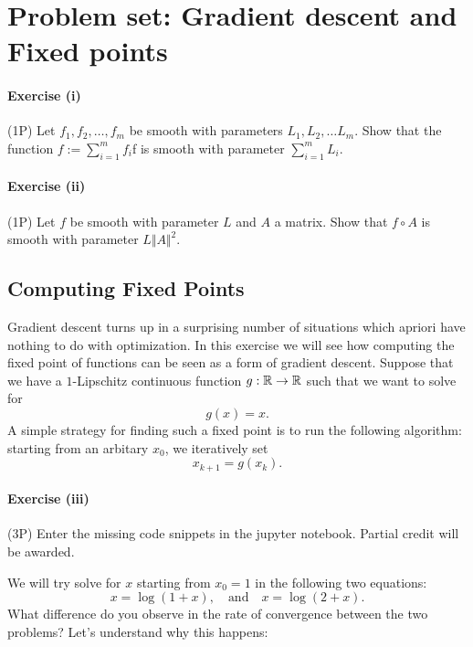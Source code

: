 \documentclass{scrartcl}
\theoremstyle{definition}
\begin{document}
\section*{Problem set: Gradient descent and Fixed points}%



\paragraph{Exercise (i)} (1P)  Let $f_1, f_2, \dots, f_m$ be smooth with parameters $L_1, L_2, \dots L_m$. Show that the function $f:= \sum_{i=1}^{m}f_i$f is smooth with parameter $\sum_{i=1}^{m}L_i$.

\paragraph{Exercise (ii)} (1P)  Let $f$ be smooth with parameter $L$ and $A$ a matrix. Show that $f\circ A$ is smooth with parameter $L \Vert A \Vert^2$.




\subsection*{Computing Fixed Points}%

Gradient descent turns up in a surprising number of situations which apriori have nothing to do with optimization.
In this exercise we will see how computing the fixed point of functions can be seen as a form of gradient descent.
Suppose that we have a $1$-Lipschitz continuous function $g : \mathbb{R} \to \mathbb{R}$ such that we want to solve for
\begin{equation}
  g(x) = x .
\end{equation}
A simple strategy for finding such a fixed point is to run the following algorithm: starting from an arbitary $x_0$,
we iteratively set
\begin{equation}
  \label{fpi}
  x_{k+1} = g(x_k) .
\end{equation}

\paragraph{Exercise (iii)} (3P) Enter the missing code snippets in the jupyter notebook. Partial credit will be awarded.

We will try solve for $x$ starting from $x_0 = 1$ in the following two equations:
\begin{equation}
  \label{log}
  x = \log(1 + x), \quad \text{and} \quad x = \log(2 + x).
\end{equation}
What difference do you observe in the rate of convergence between the two problems? Let’s understand why this happens:
\end{document}
